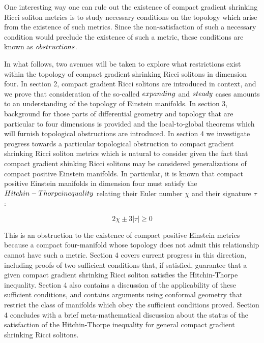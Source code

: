 \documentclass[openany, amssymb, psamsfonts]{amsart}
\theoremstyle{definition}
\numberwithin{equation}{section}
\begin{document}
    One interesting way one can rule out the existence of compact gradient shrinking Ricci soliton metrics is to study necessary conditions on the topology which arise from the existence of such metrics. Since the non-satisfaction of such a necessary condition would preclude the existence of such a metric, these conditions are known as $\emph{obstructions}$. 
    
    
    In what follows, two avenues will be taken to explore what restrictions exist within the topology of compact gradient shrinking Ricci solitons in dimension four. In section 2, compact gradient Ricci solitons are introduced in context, and we prove that consideration of the so-called $\emph{expanding}$ and $\emph{steady}$ cases amounts to an understanding of the topology of Einstein manifolds. In section 3, background for those parts of differential geometry and topology that are particular to four dimensions is provided and the local-to-global theorems which will furnish topological obstructions are introduced. In section 4 we investigate progress towards a particular topological obstruction to compact gradient shrinking Ricci soliton metrics which is natural to consider given the fact that compact gradient shinking Ricci solitons may be considered generalizations of compact positive Einstein manifolds. In particular, it is known that compact positive Einstein manifolds in dimension four must satisfy the $\emph{Hitchin-Thorpe inequality}$ relating their Euler number $\chi$ and their signature $\tau$ \cite{ernani}:

    $$2\chi \pm 3|\tau| \geq 0$$

    This is an obstruction to the existence of compact positive Einstein metrics because a compact four-manifold whose topology does not admit this relationship cannot have such a metric. Section 4 covers current progress in this direction, including proofs of two sufficient conditions that, if satisfied, guarantee that a given compact gradient shrinking Ricci soliton satisfies the Hitchin-Thorpe inequality. Section 4 also contains a discussion of the applicability of these sufficient conditions, and contains arguments using conformal geometry that restrict the class of manifolds which obey the sufficient conditions proved. Section 4 concludes with a brief meta-mathematical discussion about the status of the satisfaction of the Hitchin-Thorpe inequality for general compact gradient shrinking Ricci solitons. 
 
\end{document}
